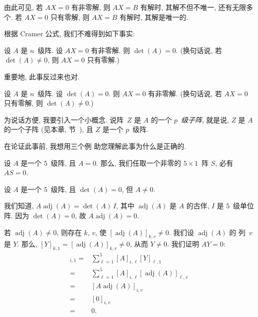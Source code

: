 由此可见, 若 \(AX = 0\) 有非零解,
则 \(AX = B\) 有解时,
其解不但不唯一, 还有无限多个.
若 \(AX = 0\) 只有零解,
则 \(AX = B\) 有解时,
其解是唯一的.

根据 Cramer 公式, 我们不难得到如下事实:

\begin{theorem}
    设 \(A\) 是 \(n\)~级阵.
    设 \(AX = 0\) 有非零解.
    则 \(\det {(A)} = 0\).
    (换句话说,
    若 \(\det {(A)} \neq 0\),
    则 \(AX = 0\) 只有零解.)
\end{theorem}

重要地, 此事反过来也对.

\begin{theorem}
    设 \(A\) 是 \(n\)~级阵.
    设 \(\det {(A)} = 0\).
    则 \(AX = 0\) 有非零解.
    (换句话说,
    若 \(AX = 0\) 只有零解,
    则 \(\det {(A)} \neq 0\).)
\end{theorem}

为说话方便, 我要引入一个小概念.
说阵~\(Z\) 是 \(A\) 的一个 \emph{\(p\)~级子阵},
就是说, \(Z\) 是 \(A\) 的一个子阵
(见本章, 节~),
且 \(Z\) 是一个 \(p\)~级阵.

在论证此事前, 我想用三个例%
助您理解此事为什么是正确的.

\begin{example}
    设 \(A\) 是一个 \(5\)~级阵,
    且 \(A = 0\).
    那么, 我们任取一个非零的 \(5 \times 1\)~阵 \(S\),
    必有 \(AS = 0\).
\end{example}

\begin{example}
    设 \(A\) 是一个 \(5\)~级阵,
    且 \(\det {(A)} = 0\),
    但 \(A \neq 0\).

    我们知道,
    \(A \operatorname{adj} {(A)} = \det {(A)}\, I\),
    其中 \(\operatorname{adj} {(A)}\)
    是 \(A\) 的古伴,
    \(I\) 是 \(5\)~级单位阵.
    因为 \(\det {(A)} = 0\),
    故 \(A \operatorname{adj} {(A)} = 0\).

    若 \(\operatorname{adj} {(A)} \neq 0\),
    则存在 \(k\), \(v\), 使
    \([\operatorname{adj} {(A)}]_{k,v} \neq 0\).
    我们设 \(\operatorname{adj} {(A)}\) 的%
    列~\(v\) 是 \(Y\).
    那么, \([Y]_{k,1}
        = [\operatorname{adj} {(A)}]_{k,v} \neq 0\),
    从而 \(Y \neq 0\).
    我们证明 \(AY = 0\):
    \begin{align*}
        [AY]_{i,1}
        = {} &
        \sum_{\ell = 1}^{5}
        {[A]_{i,\ell} [Y]_{\ell,1}}
        \\
        = {} &
        \sum_{\ell = 1}^{5}
        {[A]_{i,\ell} [\operatorname{adj} {(A)}]_{\ell,v}}
        \\
        = {} &
        [A \operatorname{adj} {(A)}]_{i,v}
        \\
        = {} &
        [0]_{i,v}
        \\
        = {} &
        0.
    \end{align*}
\end{example}

